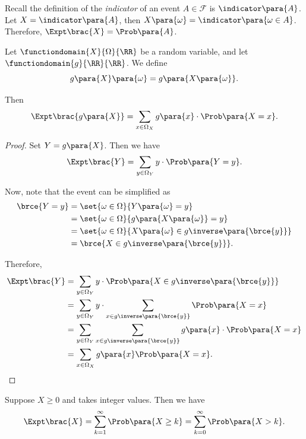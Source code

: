 \begin{example}
    \label{ex:expectation-indicator}%
    Recall the definition of the \emph{indicator} of an event \(A \in \mathcal{F}\) is \(\indicator\para{A}\). Let \(X = \indicator\para{A}\), then \(X\para{\omega} = \indicator\para{\omega \in A}\). Therefore, \(\Expt\brac{X} = \Prob\para{A}\).
\end{example}

\begin{proposition}
    \label{prop:expectation-function-random-variable}%
    Let \(\functiondomain{X}{\Omega}{\RR}\) be a random variable, and let \(\functiondomain{g}{\RR}{\RR}\). We define
    \[
        g\para{X} \para{\omega} = g\para{X\para{\omega}}.
    \]

    Then
    \[
        \Expt\brac{g\para{X}} = \sum_{x \in \Omega_X} g\para{x} \cdot \Prob\para{X = x}.
    \]
\end{proposition}

\begin{proof}
    Set \(Y = g\para{X}\). Then we have
    \[
        \Expt\brac{Y} = \sum_{y \in \Omega_Y} y \cdot \Prob\para{Y = y}.
    \]

    Now, note that the event can be simplified as
    \begin{align*}
        \brce{Y = y} &= \set{\omega \in \Omega}{Y \para{\omega} = y} \\
        &= \set{\omega \in \Omega}{g\para{X\para{\omega}} = y} \\
        &= \set{\omega \in \Omega}{X\para{\omega} \in g\inverse \para{\brce{y}}} \\
        &= \brce{X \in g\inverse \para{\brce{y}}}.
    \end{align*}

    Therefore,
    \begin{align*}
        \Expt\brac{Y} &= \sum_{y \in \Omega_Y} y \cdot \Prob\para{X \in g\inverse\para{\brce{y}}} \\
        &= \sum_{y \in \Omega_Y} y \cdot \sum_{x \in g\inverse\para{\brce{y}}} \Prob\para{X = x} \\
        &= \sum_{y \in \Omega_Y} \sum_{x \in g\inverse\para{\brce{y}}} g\para{x} \cdot \Prob\para{X = x} \\
        &= \sum_{x \in \Omega_X} g\para{x} \Prob\para{X = x}.
    \end{align*}
\end{proof}

\begin{proposition}
    \label{prop:expt-natural-number-random-variable}%
    Suppose \(X \geq 0\) and takes integer values. Then we have
    \[
        \Expt\brac{X} = \sum_{k = 1}^{\infty} \Prob\para{X \geq k} = \sum_{k = 0}^{\infty} \Prob\para{X > k}.
    \]
\end{proposition}

